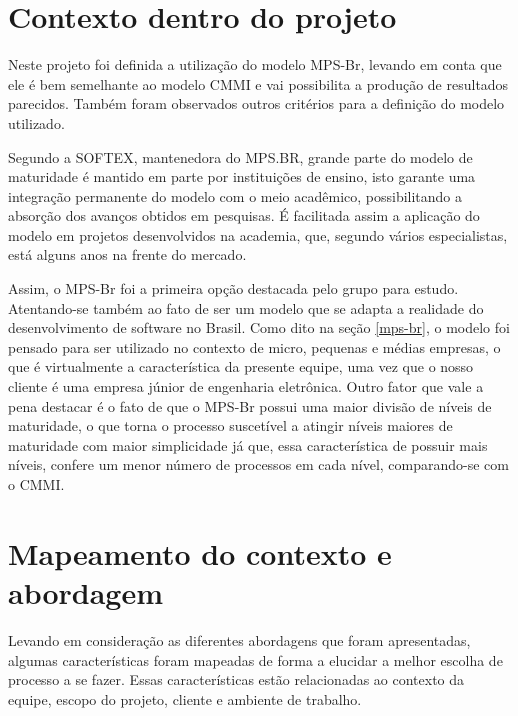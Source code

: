   \section{Contexto dentro do projeto}
Neste projeto foi definida a utilização do modelo MPS-Br, levando em conta que ele é bem semelhante ao modelo CMMI e vai possibilita a produção de resultados parecidos. Também foram observados outros critérios para a definição do modelo utilizado.

Segundo a SOFTEX, mantenedora do MPS.BR, grande parte do modelo de maturidade é mantido em parte por instituições de ensino, isto garante uma integração permanente do modelo com o meio acadêmico, possibilitando a absorção dos avanços obtidos em pesquisas. É facilitada assim a aplicação do modelo em projetos desenvolvidos na academia, que, segundo vários especialistas, está alguns anos na frente do mercado. 

Assim, o MPS-Br foi a primeira opção destacada pelo grupo para estudo. Atentando-se também ao fato de ser um modelo que se adapta a realidade do desenvolvimento de software no Brasil. Como dito na seção \ref{mps-br}, o modelo foi pensado para ser utilizado no contexto de micro, pequenas e médias empresas, o que é virtualmente a característica da presente equipe, uma vez que o nosso cliente é uma empresa júnior de engenharia eletrônica. Outro fator que vale a pena destacar é o fato de que o MPS-Br possui uma maior divisão de níveis de maturidade, o que torna o processo suscetível a atingir níveis maiores de maturidade com maior simplicidade já que, essa característica de possuir mais níveis, confere um menor número de processos em cada nível, comparando-se com o CMMI.
  
  \section{Mapeamento do contexto e abordagem}
Levando em consideração as diferentes abordagens que foram apresentadas, algumas características foram mapeadas de forma a elucidar a melhor escolha de processo a se fazer. Essas características estão relacionadas ao contexto da equipe, escopo do projeto, cliente e ambiente de trabalho.

